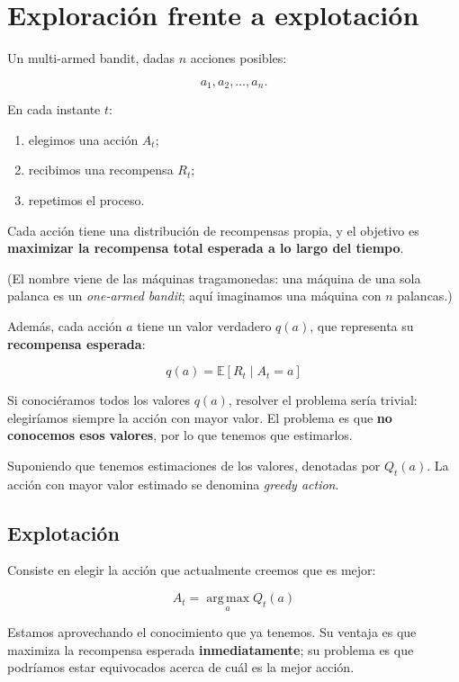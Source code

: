 \documentclass[11pt,a4paper]{article}
\newcommand{\argmax}{\operatorname*{arg\,max}}
\begin{document}
\section{Exploración frente a explotación}

Un multi-armed bandit, dadas $n$ acciones posibles:

\[
  a_1,a_2,\dots,a_n.
\]

En cada instante $t$:

\begin{enumerate}
  \item elegimos una acción $A_t$;
  \item recibimos una recompensa $R_t$;
  \item repetimos el proceso.
\end{enumerate}

Cada acción tiene una distribución de recompensas propia, y el objetivo es
\textbf{maximizar la recompensa total esperada a lo largo del tiempo}.

(El nombre viene de las máquinas tragamonedas: una máquina de una sola palanca
es un \textit{one-armed bandit}; aquí imaginamos una máquina con $n$ palancas.)

Además, cada acción $a$ tiene un valor verdadero $q(a)$, que representa su
\textbf{recompensa esperada}:

\begin{equation}
    q(a)=\mathbb{E}\!\left[R_t\mid A_t=a\right]
\end{equation}
  
Si conociéramos todos los valores $q(a)$, resolver el problema sería trivial:
elegiríamos siempre la acción con mayor valor. El problema es que
\textbf{no conocemos esos valores}, por lo que tenemos que estimarlos.


Suponiendo que tenemos estimaciones de los valores, denotadas por $Q_t(a)$.
La acción con mayor valor estimado se denomina \textit{greedy action}.

\subsection{Explotación}

Consiste en elegir la acción que actualmente creemos que es mejor:

\begin{equation}
    A_t=\argmax_a Q_t(a)
\end{equation}

Estamos aprovechando el conocimiento que ya tenemos. Su ventaja es que maximiza la
recompensa esperada \textbf{inmediatamente}; su problema es que podríamos estar
equivocados acerca de cuál es la mejor acción.
\end{document}
